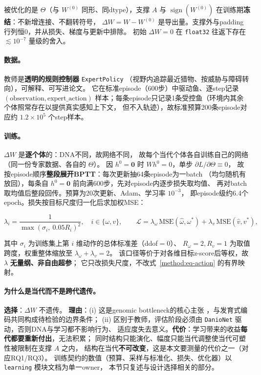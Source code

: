 被优化的是 $\Theta$（与 $W^{(0)}$ 同形、同dtype），支撑 $A$ 与
$\operatorname{sign}(W^{(0)})$ 在训练期\textbf{冻结}：不新增连接、不翻转符号，
$\Delta W=W-W^{(0)}$ 是导出量。支撑外与padding行列恒0，并从损失、梯度与更新中排除。
初始 $\Delta W=0$ 在 \texttt{float32} 往返下存在 $\lesssim10^{-7}$ 量级的舍入。

\paragraph{数据。}教师是\textbf{透明的规则控制器} \texttt{ExpertPolicy}
（视野内追踪最近猎物、按威胁与障碍转向），可解释、可写进论文。
它在标准episode（600步）中驱动鱼、逐step记录 $(\text{observation},\text{expert\_action})$
样本；每条episode只记录1条受控鱼（环境内其余个体照常存在以提供真实感知上下文，
但不入轨迹），故标准预算200条episode对应约 $1.2\times10^{5}$ 个step样本。

\paragraph{训练。}$\Delta W$ 是\textbf{逐个体}的：DNA不同，故网络不同，
故每个当代个体各自训练自己的网络（同一份专家数据、各自的 $\Theta$）。
因 $h^{0}=\mathbf 0$ 时 $W h^{0}=0$，单步 $\partial L/\partial\Theta\equiv0$，
故按episode顺序\textbf{整段展开BPTT}：每次更新抽64条episode为一batch
（均匀随机有放回），每条自 $h^{0}=\mathbf 0$ 前向满600步，先对episode内逐步损失取均值、
再对batch取均值后整段回传。预算为20次更新、Adam、学习率 $10^{-3}$，
即episode级约6.4个epoch。损失按目标尺度归一化后求加权MSE：

\begin{equation}\label{method:eq-bcloss}
\lambda_i=\frac{1}{\max(\sigma_i,\ 0.05R_i)^{2}},\quad i\in\{\omega,v\},
\qquad
\mathcal L=\lambda_\omega\,\mathrm{MSE}(\hat\omega,\omega^{*})
+\lambda_v\,\mathrm{MSE}(\hat v,v^{*}),
\end{equation}

其中 $\sigma_i$ 为训练集上第 $i$ 维动作的总体标准差（ddof$=0$）、
$R_\omega=2,R_v=1$ 为取值跨度，权重整体缩放至 $\lambda_\omega+\lambda_v=2$。
该口径等价于对各维目标z-score后等权，故 $\lambda$ \textbf{无量纲、非自由超参}；
它只改损失尺度，不改式~\eqref{method:eq-action} 的有界映射。

\paragraph{为什么是当代而不是跨代遗传。}\textbf{选择}：$\Delta W$ 不遗传。
\textbf{理由}：(i) 这是genomic bottleneck的核心主张
\citep{bib1_zador2019,bib3_shuvaev2024}，与发育式编码共同构成待检验的边界条件；
(ii) 区别于教师，评估阶段必须由 \texttt{DanioNet} 驱动，否则DNA与学习都不影响行为、
适应度失去意义。\textbf{代价}：学习带来的收益\textbf{每代都要重新付出}，无法积累；
同时结构只能演化、幅度只能当代调整使当代可塑性被限制在支撑 $A$ 之内，
结构在当代\textbf{不可改变}，这是本文要测量的代价之一（对应RQ1/RQ3）。
训练契约的数值（预算、采样与标准化、损失、优化器）以 \texttt{learning} 模块文档为单一owner，
本节只复述与设计选择相关的部分。

